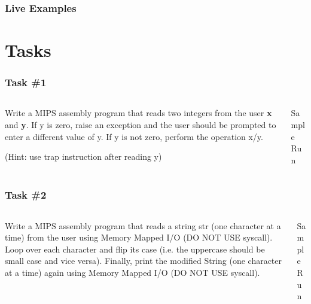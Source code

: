 \documentclass[
	11pt, %
]{beamer}
\begin{document}
\begin{frame}
	\frametitle{Live Examples}
	
\end{frame}


\section{Tasks}

\begin{frame}
	\frametitle{Task \#1}
	\begin{columns}[c]
		\begin{column}{0.4\textwidth}
			\justifying
			Write a MIPS assembly program that reads two integers from the user \textbf{x} and \textbf{y}. If y is zero, raise an exception and the user should be prompted to enter a different value of y. If y is not zero, perform the operation x/y. 

			(Hint: use trap instruction after reading y)
		\end{column}
		\begin{column}{0.6\textwidth}
		\centering
			\centering
			Sample Run 

			
		\end{column}
	\end{columns}
\end{frame}
\begin{frame}
	\frametitle{Task \#2}
	\begin{columns}[c]
		\begin{column}{0.7\textwidth}
			\justifying
			Write a MIPS assembly program that reads a string str (one character at a time) from the user using Memory Mapped I/O (\color{red}DO NOT USE syscall\color{black}). Loop over each character and flip its case (i.e. the uppercase should be small case and vice versa). Finally, print the modified String (one character at a time) again using Memory Mapped I/O (\color{red}DO NOT USE syscall\color{black}).
		\end{column}
		\begin{column}{0.3\textwidth}
		\centering
			\centering
			Sample Run 

			
		\end{column}
	\end{columns}
\end{frame}

\end{document}
